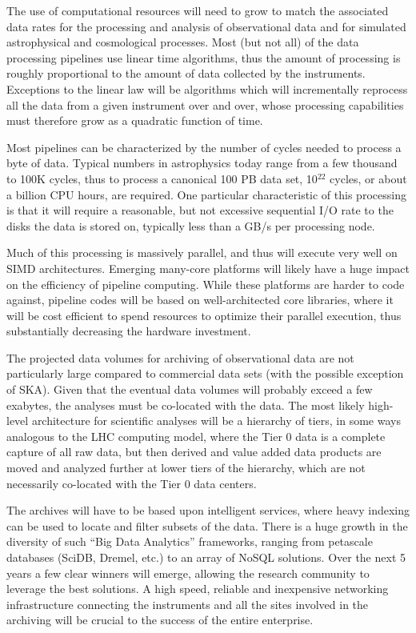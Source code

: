 The use of computational resources will need to grow to match the
associated data rates for the processing and analysis of observational
data and for simulated astrophysical and cosmological processes. Most
(but not all) of the data processing pipelines use linear time
algorithms, thus the amount of processing is roughly proportional to
the amount of data collected by the instruments. Exceptions to the
linear law will be algorithms which will incrementally reprocess all
the data from a given instrument over and over, whose processing
capabilities must therefore grow as a quadratic function of time.

Most pipelines can be characterized by the number of cycles needed to
process a byte of data. Typical numbers in astrophysics today range
from a few thousand to 100K cycles, thus to process a canonical 100 PB
data set, 10$^{22}$ cycles, or about a billion CPU hours, are
required. One particular characteristic of this processing is that it
will require a reasonable, but not excessive sequential I/O rate to
the disks the data is stored on, typically less than a GB/s per
processing node.

Much of this processing is massively parallel, and thus will execute
very well on SIMD architectures. Emerging many-core platforms will
likely have a huge impact on the efficiency of pipeline
computing. While these platforms are harder to code against, pipeline
codes will be based on well-architected core libraries, where it will
be cost efficient to spend resources to optimize their parallel
execution, thus substantially decreasing the hardware investment.


The projected
data volumes for archiving of observational data 
are not particularly large compared to
commercial data sets (with the possible exception of SKA). Given that
the eventual data volumes will probably exceed a few exabytes, the
analyses must be co-located with the data.
The most likely high-level architecture for scientific analyses will
be a hierarchy of tiers, in some ways analogous to the LHC computing
model, where the Tier 0 data is a complete capture of all raw data,
but then derived and value added data products are moved and analyzed
further at lower tiers of the hierarchy, which are not necessarily
co-located with the Tier 0 data centers.

The archives will have to be based upon intelligent services, where
heavy indexing can be used to locate and filter subsets of the
data. There is a huge growth in the diversity of such ``Big Data
Analytics'' frameworks, ranging from petascale databases (SciDB,
Dremel, etc.) to an array of NoSQL solutions. Over the next 5 years a
few clear winners will emerge, allowing the research community to
leverage the best solutions. A high speed, reliable and
inexpensive networking infrastructure connecting the instruments and
all the sites involved in the archiving will be crucial to the success
of the entire enterprise.

